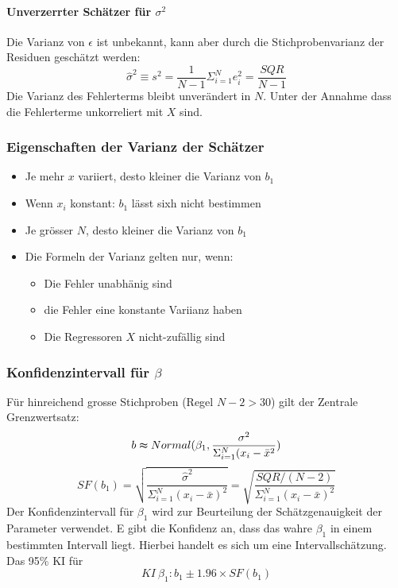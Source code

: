 \documentclass[a3paper, 8pt]{extarticle}
\begin{document}
\begin{multicols*}{5}
\paragraph{Unverzerrter Schätzer für $\sigma^2$} Die Varianz von $\epsilon$ ist unbekannt, kann aber durch die Stichprobenvarianz der Residuen geschätzt werden:\\ $$\hat{\sigma}^2 \equiv s^2 = \frac{1}{N-1}\Sigma_{i=1}^N e_i^2 = \frac{SQR}{N-1}$$
Die Varianz des Fehlerterms bleibt unverändert in $N$. Unter der Annahme dass die Fehlerterme unkorreliert mit $X$ sind.
\subsubsection{Eigenschaften der Varianz der Schätzer}
\begin{itemize}
    \item Je mehr $x$ variiert, desto kleiner die Varianz von $b_1$
    \item Wenn $x_i$ konstant: $b_1$ lässt sixh nicht bestimmen
    \item Je grösser $N$, desto kleiner die Varianz von $b_1$
    \item Die Formeln der Varianz gelten nur, wenn: \begin{itemize}
        \item Die Fehler unabhänig sind
        \item die Fehler eine konstante Variianz haben
        \item Die Regressoren $X$ nicht-zufällig sind
    \end{itemize}
\end{itemize}

\subsubsection{Konfidenzintervall für $\beta$}
Für hinreichend grosse Stichproben (Regel $N-2>30$) gilt der Zentrale Grenzwertsatz: $$b \thickapprox Normal(\beta_1, \frac{\sigma^2}{\Sigma_{i=1}^N(x_i-\bar{x}^2})$$
$$SF(b_1)=\sqrt{\frac{\hat{\sigma}^2}{\Sigma_{i=1}^N(x_i-\bar{x})^2}}=\sqrt{\frac{SQR/(N-2)}{\Sigma_{i=1}^N(x_i-\bar{x})^2}}$$
Der Konfidenzintervall für $\beta_1$ wird zur Beurteilung der Schätzgenauigkeit der Parameter verwendet. E gibt die Konfidenz an, dass das wahre $\beta_1$ in einem bestimmten Intervall liegt. Hierbei handelt es sich um eine Intervallschätzung. Das 95\% KI für $$KI \ \beta_1: b_1 \pm 1.96 \times SF(b_1)$$

\end{multicols*}
\end{document}
